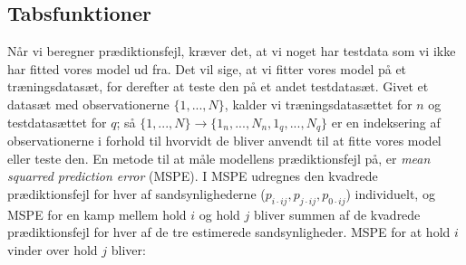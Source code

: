 \documentclass[11pt,a4paper]{article}
\begin{document}
\subsection{Tabsfunktioner}
Når vi beregner prædiktionsfejl, kræver det, at vi noget har testdata som vi ikke har fitted vores model ud fra. Det vil sige, at vi fitter vores model på et træningsdatasæt, for derefter at teste den på et andet testdatasæt. Givet et datasæt med observationerne $\{1,...,N\}$, kalder vi træningsdatasættet for $n$ og testdatasættet for $q$; så $\{1,...,N\}\rightarrow\{1_n,...,N_n,1_q,...,N_q\}$ er en indeksering af observationerne i forhold til hvorvidt de bliver anvendt til at fitte vores model eller teste den. En metode til at måle modellens prædiktionsfejl på, er \textit{mean squarred prediction error} (MSPE). I MSPE udregnes den kvadrede prædiktionsfejl for hver af sandsynlighederne ($p_{i\cdot ij}, p_{j\cdot ij}, p_{0\cdot ij}$) individuelt, og MSPE for en kamp mellem hold $i$ og hold $j$ bliver summen af de kvadrede prædiktionsfejl for hver af de tre estimerede sandsynligheder. MSPE for at hold $i$ vinder over hold $j$ bliver:
\end{document}
